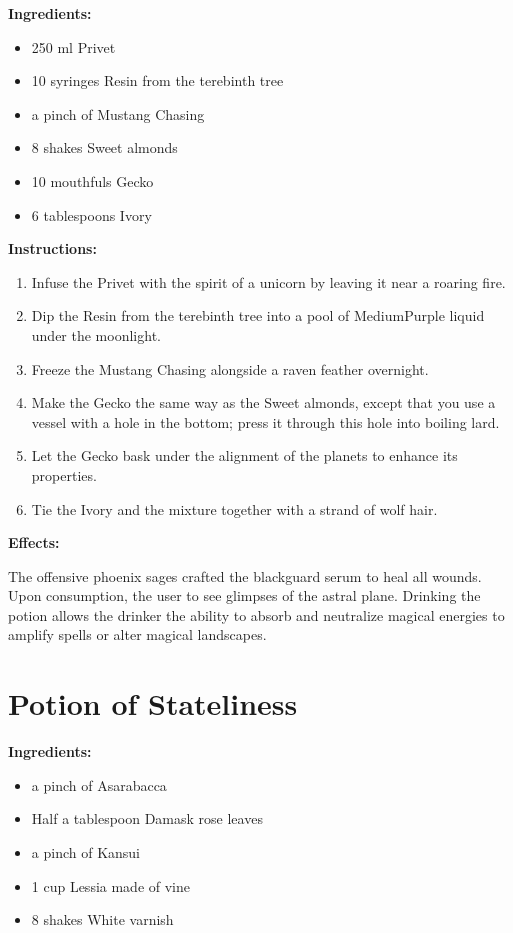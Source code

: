 \documentclass{article}
\begin{document}
\textbf{Ingredients:}

\begin{itemize}
  \item 250 ml Privet
  \item 10 syringes Resin from the terebinth tree
  \item a pinch of Mustang Chasing
  \item 8 shakes Sweet almonds
  \item 10 mouthfuls Gecko
  \item 6 tablespoons Ivory
\end{itemize}

\textbf{Instructions:}

\begin{enumerate}
  \item Infuse the Privet with the spirit of a unicorn by leaving it near a roaring fire.
  \item Dip the Resin from the terebinth tree into a pool of MediumPurple liquid under the moonlight.
  \item Freeze the Mustang Chasing alongside a raven feather overnight.
  \item Make the Gecko the same way as the Sweet almonds, except that you use a vessel with a hole in the bottom; press it through this hole into boiling lard.
  \item Let the Gecko bask under the alignment of the planets to enhance its properties.
  \item Tie the Ivory and the mixture together with a strand of wolf hair.
\end{enumerate}

\textbf{Effects:}

The offensive phoenix sages crafted the blackguard serum to heal all wounds. Upon consumption, the user to see glimpses of the astral plane. Drinking the potion allows the drinker the ability to absorb and neutralize magical energies to amplify spells or alter magical landscapes.

\newpage
\section*{Potion of Stateliness}

\textbf{Ingredients:}

\begin{itemize}
  \item a pinch of Asarabacca
  \item Half a tablespoon Damask rose leaves
  \item a pinch of Kansui
  \item 1 cup Lessia made of vine
  \item 8 shakes White varnish
\end{itemize}
\end{document}
